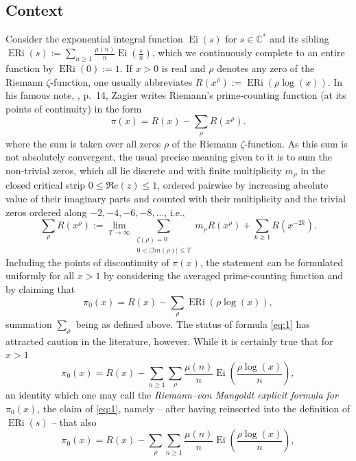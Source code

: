 \documentclass[a4paper,10pt]{amsart}
\DeclareMathOperator{\Ei}{Ei}
\DeclareMathOperator{\ERi}{ERi}
\newcommand{\C}{\mathbb C}
\theoremstyle{definition}
\numberwithin{equation}{section}
\def\C{\mathbb C}
\begin{document}
\subsection*{Context} Consider the exponential integral function $\Ei(s)$ for $s\in\C^*$ and its sibling $\ERi(s):=\sum_{n\geq 1} \frac{\mu(n)}{n} \Ei(\frac{s}{n})$, which we continuously complete to an entire function by $\ERi(0):=1$. If $x>0$ is real and $\rho$ denotes any zero of the Riemann $\zeta$-function, one usually abbreviates $R(x^\rho):=\ERi(\rho\log(x))$. In his famous note, \cite{Zagier1977}, p.\ 14, Zagier writes Riemann's prime-counting function (at its points of continuity) in the form
\begin{equation*}
\pi(x)=R(x)-\sum_{\rho}R(x^\rho).
\end{equation*}
where the sum is taken over all zeros $\rho$ of the Riemann $\zeta$-function. As this sum is not absolutely convergent, the usual precise meaning given to it is to sum the non-trivial zeros, which all lie discrete and with finite multiplicity $m_\rho$ in the closed critical strip $0\leq\Re e(z)\leq1$, ordered pairwise by increasing absolute value of their imaginary parts and counted with their multiplicity and the trivial zeros ordered along $-2,-4,-6,-8,...$, i.e., 
\begin{equation}\label{eq:Rdef2}
\sum_{\rho}R(x^\rho):= \lim_{T\to\infty}\sum_{\substack{\zeta(\rho)=0\\ 0<|\Im m(\rho)|\le T}} m_\rho R(x^\rho) + \sum_{k\geq 1} R(x^{-2k}).
\end{equation}
Including the points of discontinuity of $\pi(x)$, the statement can be formulated uniformly for all $x>1$ by considering the averaged prime-counting function and by claiming that
\begin{equation}\label{eq:1}
\pi_0(x)= R(x) - \sum_{\rho} \ERi(\rho \log(x)),
\end{equation}
summation $\sum_{\rho}$ being as defined above. The status of formula \eqref{eq:1} has attracted caution in the literature, however. While it is certainly true that for $x>1$
\begin{equation}\label{eq:1'}
\pi_0(x)= R(x) - \sum_{n\geq 1} \sum_{\rho} \frac{\mu(n)}{n} \Ei\left(\frac{\rho\log(x)}{n}\right),
\end{equation}
an identity which one may call the {\it Riemann--von Mangoldt explicit formula for $\pi_0(x)$}, the claim of \eqref{eq:1}, namely -- after having reinserted into the definition of $\ERi(s)$ --  that also
$$
\pi_0(x)= R(x) - \sum_{\rho} \sum_{n\geq 1} \frac{\mu(n)}{n} \Ei\left(\frac{\rho\log(x)}{n}\right),
$$
\end{document}
